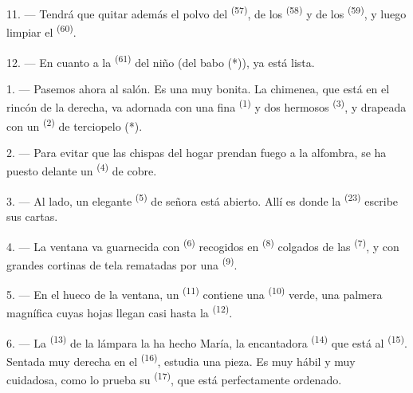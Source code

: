 

11. --- Tendrá que quitar además el polvo del 
\textsuperscript{(57)}, de los  \textsuperscript{(58)} y de los
 \textsuperscript{(59)}, y luego limpiar el 
\textsuperscript{(60)}.

12. --- En cuanto a la  \textsuperscript{(61)} del niño (del babo (*)),
ya está lista.

\VUsaut{5.0mm}
\VUsaut{3.0mm}

1. --- Pasemos ahora al salón. Es una  muy bonita. La
chimenea, que está en el rincón de la derecha, va adornada con una fina
 \textsuperscript{(1)} y dos hermosos 
\textsuperscript{(3)}, y drapeada con un  \textsuperscript{(2)} de
terciopelo (*).

2. --- Para evitar que las chispas del hogar prendan fuego a la alfombra,
se ha puesto delante un  \textsuperscript{(4)} de cobre.

3. --- Al lado, un elegante  \textsuperscript{(5)} de señora está
abierto. Allí es donde la  \textsuperscript{(23)} escribe
sus cartas.

4. --- La ventana va guarnecida con  \textsuperscript{(6)} recogidos
en  \textsuperscript{(8)} colgados de las 
\textsuperscript{(7)}, y con grandes cortinas de tela rematadas por una
 \textsuperscript{(9)}.

5. --- En el hueco de la ventana, un  \textsuperscript{(11)} contiene
una  \textsuperscript{(10)} verde, una palmera magnífica cuyas hojas
llegan casi hasta la  \textsuperscript{(12)}.

6. --- La  \textsuperscript{(13)} de la lámpara la ha hecho María,
la encantadora  \textsuperscript{(14)} que está al 
\textsuperscript{(15)}. Sentada muy derecha en el  \textsuperscript{(16)},
estudia una pieza. Es muy hábil y muy cuidadosa, como lo prueba su
 \textsuperscript{(17)}, que está perfectamente
ordenado.

